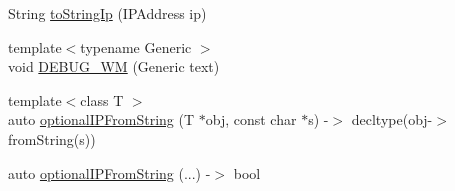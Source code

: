 \begin{DoxyCompactItemize}
String \hyperlink{class_wi_fi_manager_a8dfd64cefecbdf26242b16eca335c20b}{to\+String\+Ip} (I\+P\+Address ip)
\item 
{\footnotesize template$<$typename Generic $>$ }\\void \hyperlink{class_wi_fi_manager_ae5f595c670ccbcf9a191baf50f5c7c26}{D\+E\+B\+U\+G\+\_\+\+WM} (Generic text)
\item 
{\footnotesize template$<$class T $>$ }\\auto \hyperlink{class_wi_fi_manager_a6a94f08eb43e0871932556a4ccfa11b7}{optional\+I\+P\+From\+String} (T $\ast$obj, const char $\ast$s) -\/$>$ decltype(obj-\/$>$from\+String(s))
\item 
auto \hyperlink{class_wi_fi_manager_aa248b818eee0423b14a88c637f7c4637}{optional\+I\+P\+From\+String} (...) -\/$>$ bool
\end{DoxyCompactItemize}
